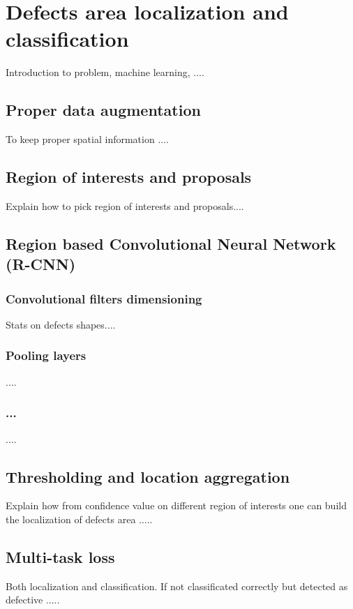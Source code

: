 \section{Defects area localization and classification}\label{section:mc-cnn}
    Introduction to problem, machine learning, ....

    \subsection{Proper data augmentation}
        To keep proper spatial information ....

    \subsection{Region of interests and proposals}
        Explain how to pick region of interests and proposals....

    \subsection{Region based Convolutional Neural Network (R-CNN)}
        \subsubsection{Convolutional filters dimensioning}
            Stats on defects shapes....
        \subsubsection{Pooling layers}
            ....
        \subsubsection{...}
            ....
    
    \subsection{Thresholding and location aggregation}
        Explain how from confidence value on different region of interests one can build the localization of defects area .....

    \subsection{Multi-task loss}
    Both localization and classification. If not classificated correctly but detected as defective .....